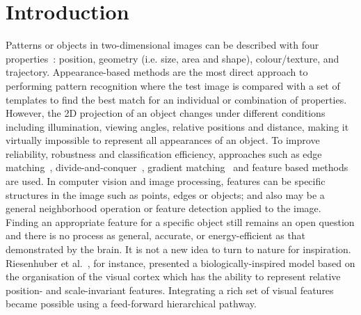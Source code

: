 \chapter{Introduction}
\label{cha:intro}
Patterns or objects in two-dimensional images can be described with four properties~\cite{wysoski2008fast}: position, geometry (i.e. size, area and shape), colour/texture, and trajectory. 
Appearance-based methods are the most direct approach to performing pattern recognition where the test image is compared with a set of templates to find the best match for an individual or combination of properties. 
However, the 2D projection of an object changes under different conditions including illumination, viewing angles, relative positions and distance, making it virtually impossible to represent all appearances of an object. 
To improve reliability, robustness and classification efficiency, approaches such as edge matching~\cite{canny1986computational}, divide-and-conquer~\cite{toygar2004multiple}, gradient matching~\cite{wei2006robust} and feature based methods~\cite{lowe2004distinctive, bay2008speeded} are used.
In computer vision and image processing, features can be specific structures in the image such as points, edges or objects; and also may be a general neighborhood operation or feature detection applied to the image.
Finding an appropriate feature for a specific object still remains an open question and there is no process as general, accurate, or energy-efficient as that demonstrated by the brain.
It is not a new idea to turn to nature for inspiration. 
Riesenhuber et al.~\cite{riesenhuber1999hierarchical}, for instance, presented a biologically-inspired model based on the organisation of the visual cortex which has the ability to represent relative position- and scale-invariant features.
Integrating a rich set of visual features became possible using a feed-forward hierarchical pathway. 

